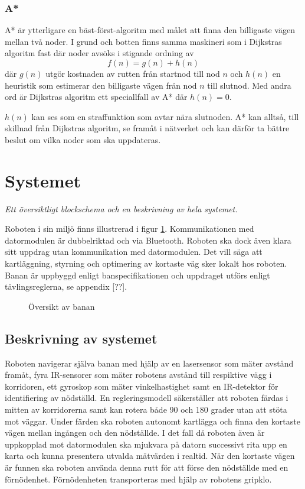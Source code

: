 \documentclass[11pt]{article}
\begin{document}
\begin{flushleft}
\subsubsection{A*}
A* är ytterligare en bäst-först-algoritm med målet att finna den billigaste vägen mellan två noder. I grund och botten finns samma maskineri som i Dijkstras algoritm fast där noder avsöks i stigande ordning av
\begin{equation*}
	f(n) = g(n) + h(n)
\end{equation*}
där $g(n)$ utgör kostnaden av rutten från startnod till nod $n$ och $h(n)$ en heuristik som estimerar den billigaste vägen från nod $n$ till slutnod. Med andra ord är Dijkstras algoritm ett speciallfall av A* där $h(n) = 0$.

$h(n)$ kan ses som en straffunktion som avtar nära slutnoden. A* kan alltså, till skillnad från Dijkstras algoritm, se framåt i nätverket och kan därför ta bättre beslut om vilka noder som ska uppdateras.

\section{Systemet}
\textit{Ett översiktligt blockschema och en beskrivning av hela systemet.}

Roboten i sin miljö finns illustrerad i figur \ref{system}. Kommunikationen med datormodulen är dubbelriktad och via Bluetooth\textsuperscript{\circledR}. Roboten ska dock även klara sitt uppdrag utan kommunikation med datormodulen. Det vill säga att kartläggning, styrning och optimering av kortaste väg sker lokalt hos roboten. Banan är uppbyggd enligt banspecifikationen och uppdraget utförs enligt tävlingsreglerna, se appendix [??].

\begin{figure}[htbp]
\centering
\noindent\resizebox{.8\linewidth}{!}{
	}
	\caption{Översikt av banan\label{system}}	
\end{figure}

\subsection{Beskrivning av systemet}
Roboten navigerar själva banan med hjälp av en lasersensor som mäter avstånd framåt, fyra IR-sensorer som mäter robotens avstånd till respiktive vägg i korridoren, ett gyroskop som mäter vinkelhastighet samt en IR-detektor för identifiering av nödställd. En regleringsmodell säkerställer att roboten färdas i mitten av korridorerna samt kan rotera både 90 och 180 grader utan att stöta mot väggar. Under färden ska roboten autonomt kartlägga och finna den kortaste vägen mellan ingången och den nödställde. I det fall då roboten även är uppkopplad mot datormodulen ska mjukvara på datorn successivt rita upp en karta och kunna presentera utvalda mätvärden i realtid. När den kortaste vägen är funnen ska roboten använda denna rutt för att förse den nödställde med en förnödenhet. Förnödenheten transporteras med hjälp av robotens gripklo.


\end{flushleft}
\end{document}
